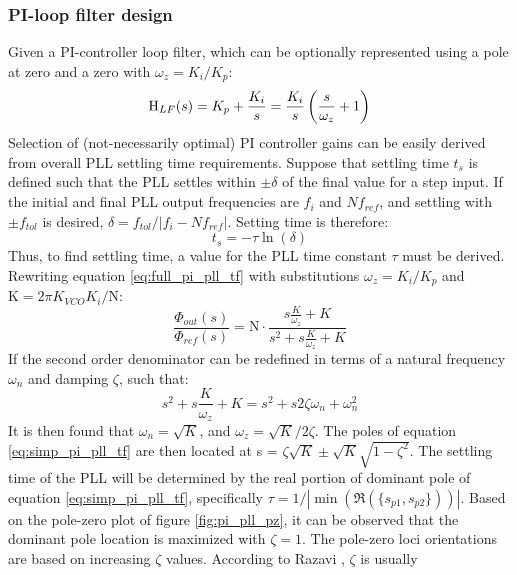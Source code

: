 		\subsubsection{PI-loop filter design}
			Given a PI-controller loop filter, which can be optionally represented using a pole at zero and a zero with $\omega_z = K_i/K_p$:
			\begin{equation} \label{eq:pi_pll_tf}
				\textnormal{H}_{LF}(s) = K_p + \frac{K_i}{s}  = \frac{K_i}{s}\left(\frac{s}{\omega_z} + 1\right) 
			\end{equation}
			Selection of (not-necessarily optimal) PI controller gains can be easily derived from overall PLL settling time requirements. Suppose that settling time $t_s$ is defined such that the PLL settles within $\pm \delta$ of the final value for a step input. If the initial and final PLL output frequencies are $f_i$ and $Nf_{ref}$, and settling with $\pm f_{tol}$ is desired,  $\delta = f_{tol}/|f_i - Nf_{ref}|$. Setting time is therefore:
			\begin{equation}
				t_s = -\tau\ln(\delta)
			\end{equation}
			Thus, to find settling time, a value for the PLL time constant $\tau$ must be derived. Rewriting equation \ref{eq:full_pi_pll_tf} with substitutions $\omega_z = K_i/K_p$ and $\mathrm{K} = 2\pi K_{VCO}K_i/\mathrm{N}$:
			\begin{equation} \label{eq:simp_pi_pll_tf}
				\frac{\Phi_{out}(s)}{\Phi_{ref}(s)} = \mathrm{N}\cdot\frac{s\frac{K}{\omega_z} + K }{s^2 + s\frac{K}{\omega_z} + K}
			\end{equation}
			If the second order denominator can be redefined in terms of a natural frequency $\omega_n$ and damping $\zeta$, such that:
			\begin{equation}
				s^2 + s\frac{K}{\omega_z} + K = s^2 + s2\zeta\omega_n + \omega_n^2
			\end{equation}
			It is then found that $\omega_n = \sqrt{K}$, and $\omega_z = \sqrt{K}/2\zeta$. The poles of equation \ref{eq:simp_pi_pll_tf} are then located at s = $\zeta\sqrt{K} \pm \sqrt{K}\sqrt{1-\zeta^2}$.
			The settling time of the PLL will be determined by the real portion of dominant pole of equation \ref{eq:simp_pi_pll_tf}, specifically $\tau = 1/|\min(\Re(\{s_{p1}, s_{p2}\}))|$. Based on the pole-zero plot of figure \ref{fig:pi_pll_pz}, it can be observed that the dominant pole location is maximized with $\zeta=1$. The pole-zero loci orientations are based on increasing $\zeta$ values. According to Razavi \cite{razavi_2017}, $\zeta$ is usually 
